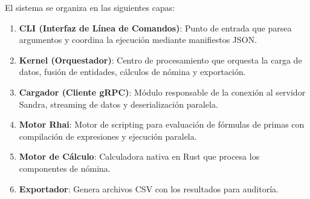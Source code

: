 \bigskip

El sistema se organiza en las siguientes capas:

\begin{enumerate}
    \item \textbf{CLI (Interfaz de Línea de Comandos)}: Punto de entrada que parsea argumentos y coordina la ejecución mediante manifiestos JSON.
    \item \textbf{Kernel (Orquestador)}: Centro de procesamiento que orquesta la carga de datos, fusión de entidades, cálculos de nómina y exportación.
    \item \textbf{Cargador (Cliente gRPC)}: Módulo responsable de la conexión al servidor Sandra, streaming de datos y deserialización paralela.
    \item \textbf{Motor Rhai}: Motor de scripting para evaluación de fórmulas de primas con compilación de expresiones y ejecución paralela.
    \item \textbf{Motor de Cálculo}: Calculadora nativa en Rust que procesa los componentes de nómina.
    \item \textbf{Exportador}: Genera archivos CSV con los resultados para auditoría.
\end{enumerate}

\vfill
\newpage
